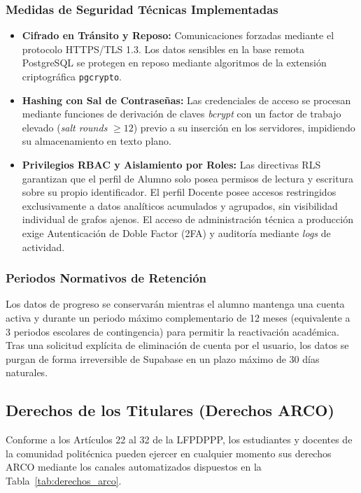 \subsubsection{Medidas de Seguridad Técnicas Implementadas}
\begin{itemize}
    \item \textbf{Cifrado en Tránsito y Reposo:} Comunicaciones forzadas mediante el protocolo HTTPS/TLS 1.3. Los datos sensibles en la base remota PostgreSQL se protegen en reposo mediante algoritmos de la extensión criptográfica \texttt{pgcrypto}.
    \item \textbf{Hashing con Sal de Contraseñas:} Las credenciales de acceso se procesan mediante funciones de derivación de claves \textit{bcrypt} con un factor de trabajo elevado (\textit{salt rounds} $\ge 12$) previo a su inserción en los servidores, impidiendo su almacenamiento en texto plano.
    \item \textbf{Privilegios RBAC y Aislamiento por Roles:} Las directivas RLS garantizan que el perfil de Alumno solo posea permisos de lectura y escritura sobre su propio identificador. El perfil Docente posee accesos restringidos exclusivamente a datos analíticos acumulados y agrupados, sin visibilidad individual de grafos ajenos. El acceso de administración técnica a producción exige Autenticación de Doble Factor (2FA) y auditoría mediante \textit{logs} de actividad.
\end{itemize}

\subsubsection{Periodos Normativos de Retención}
Los datos de progreso se conservarán mientras el alumno mantenga una cuenta activa y durante un periodo máximo complementario de 12 meses (equivalente a 3 periodos escolares de contingencia) para permitir la reactivación académica. Tras una solicitud explícita de eliminación de cuenta por el usuario, los datos se purgan de forma irreversible de Supabase en un plazo máximo de 30 días naturales.

\subsection{Derechos de los Titulares (Derechos ARCO)}
\label{subsec:privacidad_arco}

Conforme a los Artículos 22 al 32 de la LFPDPPP, los estudiantes y docentes de la comunidad politécnica pueden ejercer en cualquier momento sus derechos ARCO mediante los canales automatizados dispuestos en la Tabla~\ref{tab:derechos_arco}.

